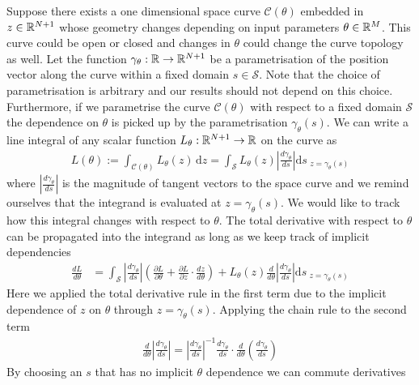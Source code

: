 Suppose there exists a one dimensional space curve $\mathcal{C(\theta)}$ embedded in $z\in\mathbb{R}^{N+1}$ whose geometry changes depending on input parameters $\theta\in\mathbb{R}^M$. This curve could be open or closed and changes in $\theta$ could change the curve topology as well. Let the function $\gamma_{\theta}:\mathbb{R}\rightarrow\mathbb{R}^{N+1}$ be a parametrisation of the position vector along the curve within a fixed domain $s\in\mathcal{S}$. Note that the choice of parametrisation is arbitrary and our results should not depend on this choice. Furthermore, if we parametrise the curve $\mathcal{C}(\theta)$ with respect to a fixed domain $\mathcal{S}$ the dependence on $\theta$ is picked up by the parametrisation $\gamma_{\theta}(s)$. We can write a line integral of any scalar function $L_{\theta}:\mathbb{R}^{N+1}\rightarrow\mathbb{R}$ on the curve as
\begin{align}
    L(\theta):=
    \int_\mathcal{C(\theta)}\! L_{\theta}(z)\,\mathrm{d}z
    =\int_\mathcal{S}\! L_{\theta}(z)\left|\frac{d\gamma_{\theta}}{ds}\right|\mathrm{d}s_{\,\,z=\gamma_{\theta}(s)}
\end{align}
where $\left|\frac{d\gamma_{\theta}}{ds}\right|$ is the magnitude of tangent vectors to the space curve and we remind ourselves that the integrand is evaluated at $z=\gamma_{\theta}(s)$. We would like to track how this integral changes with respect to $\theta$. The total derivative with respect to $\theta$ can be propagated into the integrand \cite{Flanders1973DifferentiationSign} as long as we keep track of implicit dependencies
\begin{align}
    \frac{dL}{d\theta} &=\int_\mathcal{S}
    \left|\frac{d\gamma_{\theta}}{ds}\right|
    \left(
        \frac{\partial L}{\partial\theta}+
        \frac{\partial L}{\partial z}\cdot
        \frac{dz}{d\theta}
    \right)
    +L_{\theta}(z)\frac{d}{d\theta}\left|\frac{d\gamma_{\theta}}{ds}\right|
    \mathrm{d}s_{\,\,z=\gamma_{\theta}(s)}
\end{align}
Here we applied the total derivative rule in the first term due to the implicit dependence of $z$ on $\theta$ through $z=\gamma_{\theta}(s)$. Applying the chain rule to the second term
\begin{align}
    \frac{d}{d\theta}\left|\frac{d\gamma_{\theta}}{ds}\right|=
    \left|\frac{d\gamma_{\theta}}{ds}\right|^{-1}
    \frac{d\gamma_{\theta}}{ds}\cdot\frac{d}{d\theta}
    \left(\frac{d\gamma_{\theta}}{ds}\right)
\end{align}
By choosing an $s$ that has no implicit $\theta$ dependence we can commute derivatives
